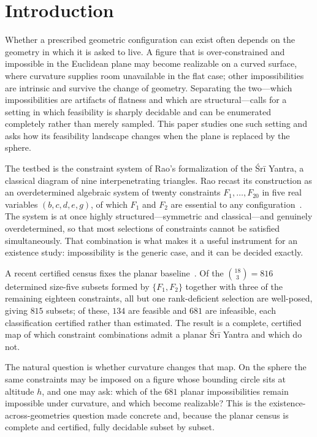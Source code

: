 \documentclass[pdflatex,sn-mathphys-num]{sn-jnl}
\theoremstyle{thmstyleone}%
\theoremstyle{thmstyletwo}%
\theoremstyle{thmstylethree}%
\begin{document}
\section{Introduction}
\label{sec:intro}

Whether a prescribed geometric configuration can exist often depends on the
geometry in which it is asked to live. A figure that is over-constrained and
impossible in the Euclidean plane may become realizable on a curved surface,
where curvature supplies room unavailable in the flat case; other impossibilities are intrinsic and survive the change of geometry. Separating the two---which impossibilities are artifacts of flatness and which are structural---calls for a setting in which feasibility is sharply decidable and can be enumerated completely rather than merely sampled. This paper studies one such setting and asks how its feasibility landscape changes when the plane is replaced by the sphere.

The testbed is the constraint system of Rao's formalization of the Śrī Yantra, a classical diagram of nine interpenetrating triangles. Rao recast its construction as an overdetermined algebraic system of twenty constraints
$F_1,\dots,F_{20}$ in five real variables $(b,c,d,e,g)$, of which $F_1$ and $F_2$ are essential to any configuration~\cite{rao}. The system is at once highly structured---symmetric and classical---and genuinely overdetermined, so that most selections of constraints cannot be satisfied simultaneously. That combination is what makes it a useful instrument for an existence study: impossibility is the generic case, and it can be decided exactly.

A recent certified census fixes the planar baseline~\cite{plane-census}. Of the $\binom{18}{3}=816$ determined size-five subsets formed by $\{F_1,F_2\}$ together with three of the remaining eighteen constraints, all but one rank-deficient selection are well-posed, giving $815$ subsets; of these, $134$ are feasible and $681$ are infeasible, each classification certified rather than estimated. The result is a complete, certified map of which constraint combinations admit a planar Śrī Yantra and which do not.

The natural question is whether curvature changes that map. On the sphere the
same constraints may be imposed on a figure whose bounding circle sits at
altitude $h$, and one may ask: which of the $681$ planar impossibilities remain impossible under curvature, and which become realizable? This is the
existence-across-geometries question made concrete and, because the planar census is complete and certified, fully decidable subset by subset.
\end{document}
